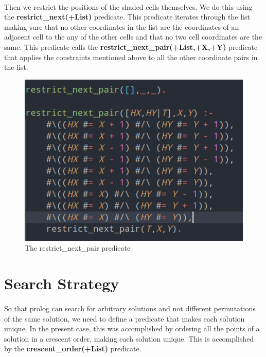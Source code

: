 \documentclass[runningheads]{llncs}
\begin{document}
\paragraph{}
Then we restrict the positions of the shaded cells themselves. We do this using the \textbf{restrict\_next(+List)} predicate.
This predicate iterates through the list making sure that no other coordinates in the list are the coordinates of an 
adjacent cell to the any of the other cells and that no two cell coordinates are the same. This predicate calls the
\textbf{restrict\_next\_pair(+List,+X,+Y)} predicate that applies the constraints mentioned above to all the other 
coordinate pairs in the list.

\begin{figure}
    \begin{center}
        \includegraphics[scale=0.5]{images/restrictPair.png}
        \caption{The restrict\_next\_pair predicate} \label{fig3}
    \end{center}
\end{figure}

\section{Search Strategy}
\paragraph{}
So that prolog can search for arbitrary solutions and not different permutations of the same solution, we need to define
a predicate that makes each solution unique. In the present case, this was accomplished by ordering all the points 
of a solution in a crescent order, making each solution unique. This is accomplished by the \textbf{crescent\_order(+List)}
predicate.
\end{document}
